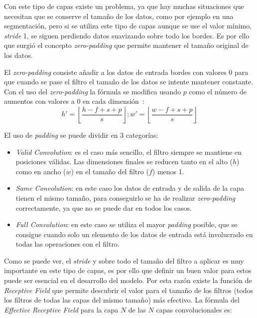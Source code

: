 Con este tipo de capas existe un problema, ya que hay muchas situaciones que necesitan que se conserve el tamaño de los datos, como por ejemplo en una segmentación, pero si se utiliza este tipo de capas aunque se use el valor mínimo, \textit{stride} 1, se siguen perdiendo datos suavizando sobre todo los bordes. Es por ello que surgió el concepto \textit{zero-padding} que permite mantener el tamaño original de los datos.

El \textit{zero-padding} consiste añadir a los datos de entrada bordes con valores 0 para que cuando se pase el filtro el tamaño de los datos se intente mantener constante. Con el uso del \textit{zero-padding} la fórmula se modifica usando $p$ como el número de aumentos con valores a 0 en cada dimensión~\cite{zeropadding}:
\begin{equation}
h'=\left \lfloor \frac{h-f+s+p}{s} \right \rfloor; w'= \left \lfloor \frac{w-f+s+p}{s} \right \rfloor
\end{equation}

El uso de \textit{padding} se puede dividir en 3 categorías:
\begin{itemize}
	\item \textit{Valid Convolution}: es el caso más sencillo, el filtro siempre se mantiene en posiciones válidas. Las dimensiones finales se reducen tanto en el alto ($h$) como en ancho ($w$) en el tamaño del filtro ($f$) menos 1.
	\item \textit{Same Convolution}: en este caso los datos de entrada y de salida de la capa tienen el mismo tamaño, para conseguirlo se ha de realizar \textit{zero-padding} correctamente, ya que no se puede dar en todos los casos.
	\item \textit{Full Convolution}: en este caso se utiliza el mayor \textit{padding} posible, que se consigue cuando solo un elemento de los datos de entrada está involucrado en todas las operaciones con el filtro.
\end{itemize}

Como se puede ver, el \textit{stride} y sobre todo el tamaño del filtro a aplicar es muy importante en este tipo de capas, es por ello que definir un buen valor para estos puede ser esencial en el desarrollo del modelo. Por esta razón existe la función de \textit{Receptive Field} que permite descubrir el valor para el tamaño de los filtros (todos los filtros de todas las capas del mismo tamaño) más efectivo. La fórmula del \textit{Effective Receptive Field} para la capa $N$ de las $N$ capas convolucionales es:

